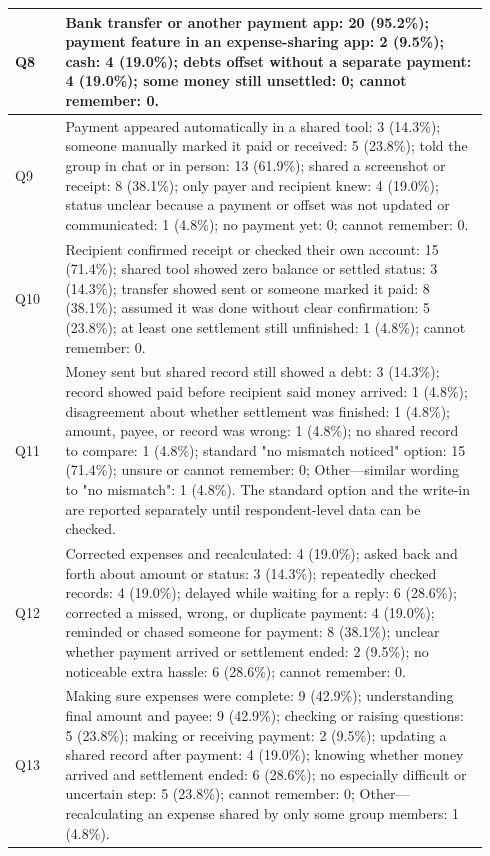 {\begin{longtable}{@{}>{\raggedright\arraybackslash}p{0.10\linewidth}>{\raggedright\arraybackslash}p{0.84\linewidth}@{}}
\midrule
Q8 & Bank transfer or another payment app: 20 (95.2\%); payment feature in an expense-sharing app: 2 (9.5\%); cash: 4 (19.0\%); debts offset without a separate payment: 4 (19.0\%); some money still unsettled: 0; cannot remember: 0. \\
\midrule
Q9 & Payment appeared automatically in a shared tool: 3 (14.3\%); someone manually marked it paid or received: 5 (23.8\%); told the group in chat or in person: 13 (61.9\%); shared a screenshot or receipt: 8 (38.1\%); only payer and recipient knew: 4 (19.0\%); status unclear because a payment or offset was not updated or communicated: 1 (4.8\%); no payment yet: 0; cannot remember: 0. \\
\midrule
Q10 & Recipient confirmed receipt or checked their own account: 15 (71.4\%); shared tool showed zero balance or settled status: 3 (14.3\%); transfer showed sent or someone marked it paid: 8 (38.1\%); assumed it was done without clear confirmation: 5 (23.8\%); at least one settlement still unfinished: 1 (4.8\%); cannot remember: 0. \\
\midrule
Q11 & Money sent but shared record still showed a debt: 3 (14.3\%); record showed paid before recipient said money arrived: 1 (4.8\%); disagreement about whether settlement was finished: 1 (4.8\%); amount, payee, or record was wrong: 1 (4.8\%); no shared record to compare: 1 (4.8\%); standard "no mismatch noticed" option: 15 (71.4\%); unsure or cannot remember: 0; Other—similar wording to "no mismatch": 1 (4.8\%). The standard option and the write-in are reported separately until respondent-level data can be checked. \\
\midrule
Q12 & Corrected expenses and recalculated: 4 (19.0\%); asked back and forth about amount or status: 3 (14.3\%); repeatedly checked records: 4 (19.0\%); delayed while waiting for a reply: 6 (28.6\%); corrected a missed, wrong, or duplicate payment: 4 (19.0\%); reminded or chased someone for payment: 8 (38.1\%); unclear whether payment arrived or settlement ended: 2 (9.5\%); no noticeable extra hassle: 6 (28.6\%); cannot remember: 0. \\
\midrule
Q13 & Making sure expenses were complete: 9 (42.9\%); understanding final amount and payee: 9 (42.9\%); checking or raising questions: 5 (23.8\%); making or receiving payment: 2 (9.5\%); updating a shared record after payment: 4 (19.0\%); knowing whether money arrived and settlement ended: 6 (28.6\%); no especially difficult or uncertain step: 5 (23.8\%); cannot remember: 0; Other—recalculating an expense shared by only some group members: 1 (4.8\%). \\
\end{longtable}
}

